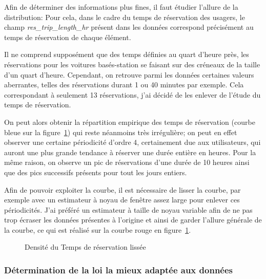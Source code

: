 \documentclass[12pt,a4paper]{article}
\newcommand{\1}[1]{\mathbbm{1}_{\{#1\}} }
\theoremstyle{definition}
\begin{document}
{Afin de déterminer des informations plus fines, il faut étudier l'allure de la distribution:
Pour cela, dans le cadre du temps de réservation des usagers, le champ \emph{res\_trip\_length\_hr} présent dans les données correspond précisément au temps de réservation de chaque élément.

Il ne comprend supposément que des temps définies au quart d'heure près, les réservations pour les voitures basés-station se faisant sur des créneaux de la taille d'un quart d'heure. Cependant, on retrouve parmi les données certaines valeurs aberrantes, telles des réservations durant 1 ou 40 minutes par exemple.  Cela correspondant à seulement 13 réservations, j'ai décidé de les enlever de l'étude du temps de réservation.

On peut alors obtenir la répartition empirique des temps de réservation (courbe bleue sur la figure~\ref{lissage_courbe}) qui reste néanmoins très irrégulière; on peut en effet observer une certaine périodicité d'ordre 4, certainement due aux utilisateurs, qui auront une plus grande tendance à réserver une durée entière en heures. Pour la même raison, on observe un pic de réservations d'une durée de 10 heures ainsi que des pics successifs présents pour tout les jours entiers.

Afin de pouvoir exploiter la courbe, il est nécessaire de lisser la courbe, par exemple avec un estimateur à noyau de fenêtre assez large pour enlever ces périodicités. J'ai préféré un estimateur à taille de noyau variable afin de ne pas trop écraser les données présentes à l'origine et ainsi de garder l'allure générale de la courbe, ce qui est réalisé sur la courbe rouge en figure~\ref{lissage_courbe}.


\begin{figure} [h]
\centering
{}
\caption{Densité du Temps de réservation lissée}
\label{lissage_courbe}
\end{figure}


\subsubsection{Détermination de la loi la mieux adaptée aux données}

}
\end{document}

